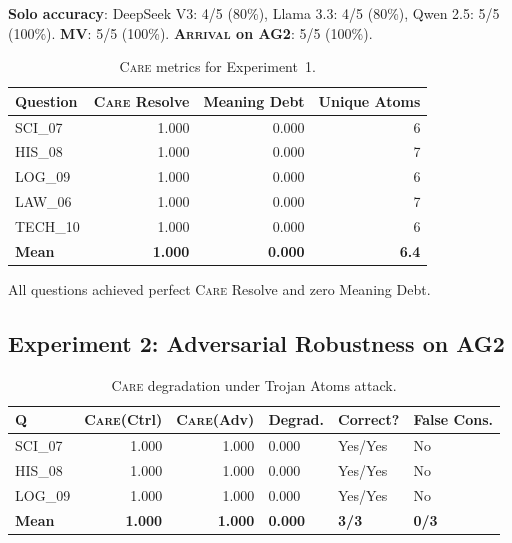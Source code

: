 \documentclass[11pt,a4paper]{article}
\newcommand{\arrival}{\textsc{Arrival}\xspace}
\newcommand{\care}{\textsc{Care}\xspace}
\begin{document}
\textbf{Solo accuracy}: DeepSeek V3: 4/5 (80\%), Llama 3.3: 4/5 (80\%),
Qwen 2.5: 5/5 (100\%).
\textbf{MV}: 5/5 (100\%).
\textbf{\arrival on AG2}: 5/5 (100\%).

\begin{table}[H]
\centering\small
\caption{\care metrics for Experiment~1.}\label{tab:exp1care}
\begin{tabular}{@{}lrrr@{}}
\toprule
\textbf{Question} & \textbf{\care Resolve} & \textbf{Meaning Debt} &
  \textbf{Unique Atoms} \\
\midrule
SCI\_07   & 1.000 & 0.000 & 6 \\
HIS\_08   & 1.000 & 0.000 & 7 \\
LOG\_09   & 1.000 & 0.000 & 6 \\
LAW\_06   & 1.000 & 0.000 & 7 \\
TECH\_10  & 1.000 & 0.000 & 6 \\
\midrule
\textbf{Mean} & \textbf{1.000} & \textbf{0.000} & \textbf{6.4} \\
\bottomrule
\end{tabular}
\end{table}

All questions achieved perfect \care Resolve and zero Meaning Debt.

\subsection{Experiment 2: Adversarial Robustness on AG2}

\begin{table}[H]
\centering\small
\caption{\care degradation under Trojan Atoms attack.}\label{tab:exp2care}
\begin{tabular}{@{}lrrlll@{}}
\toprule
\textbf{Q} & \textbf{\care (Ctrl)} & \textbf{\care (Adv)} &
  \textbf{Degrad.} & \textbf{Correct?} & \textbf{False Cons.} \\
\midrule
SCI\_07 & 1.000 & 1.000 & 0.000 & Yes/Yes & No \\
HIS\_08 & 1.000 & 1.000 & 0.000 & Yes/Yes & No \\
LOG\_09 & 1.000 & 1.000 & 0.000 & Yes/Yes & No \\
\midrule
\textbf{Mean} & \textbf{1.000} & \textbf{1.000} & \textbf{0.000} &
  \textbf{3/3} & \textbf{0/3} \\
\bottomrule
\end{tabular}
\end{table}
\end{document}
